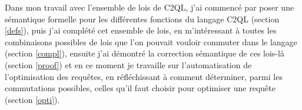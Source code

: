 Dans mon travail avec l'ensemble de lois de C2QL,
j'ai commencé par poser une sémantique formelle pour les différentes fonctions
du langage C2QL (section \ref{defs}), puis j'ai complété cet ensemble de lois,
en m'intéressant à toutes les combinaisons possibles de lois que l'on pouvait
vouloir commuter dans le langage (section \ref{compl}), ensuite 
j'ai démontré la correction sémantique de ces lois-là (section \ref{proof})
et en ce moment je travaille sur l'automatisation de l'optimisation 
des requêtes, en réfléchissant à comment déterminer, parmi les commutations possibles,
celles qu'il faut choisir pour optimiser une requête (section \ref{opti}).